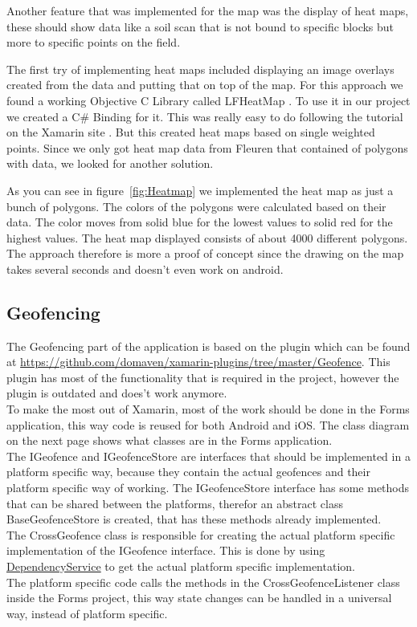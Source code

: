 Another feature that was implemented for the map was the display of heat maps, these should show data like a soil scan that is not bound to specific blocks but more to specific points on the field.

The first try of implementing heat maps included displaying an image \glspl{overlay} created from the data and putting that on top of the map. For this approach we found a working Objective C Library called LFHeatMap \cite{LFHeatMaps}. To use it in our project we created a C\# Binding for it.
This was really easy to do following the tutorial on the Xamarin site \cite{bindingtut}. But this created heat maps based on single weighted points. Since we only got heat map data from Fleuren that contained of polygons with data, we looked for another solution.

As you can see in figure~\ref{fig:Heatmap} we implemented the heat map as just a bunch of polygons. The colors of the polygons were calculated based on their data. The color moves from solid blue for the lowest values to solid red for the highest values. The heat map displayed consists of about 4000 different polygons. The approach therefore is more a proof of concept since the drawing on the map takes several seconds and doesn't even work on android.


\subsection{Geofencing}

The \gls{Geofencing} part of the application is based on the plugin which can be found at \url{https://github.com/domaven/xamarin-plugins/tree/master/Geofence}. This plugin has most of the functionality that is required in the project, however the plugin is outdated and does't work anymore. \\
To make the most out of Xamarin, most of the work should be done in the Forms application, this way code is reused for both Android and iOS. The class diagram on the next page shows what classes are in the Forms application. \\ 
The IGeofence and IGeofenceStore are interfaces that should be implemented in a platform specific way, because they contain the actual geofences and their platform specific way of working. The IGeofenceStore interface has some methods that can be shared between the platforms, therefor an abstract class BaseGeofenceStore is created, that has these methods already implemented.\\
The CrossGeofence class is responsible for creating the actual platform specific implementation of the IGeofence interface. This is done by using \href{https://developer.xamarin.com/guides/xamarin-forms/dependency-service/}{DependencyService} to get the actual platform specific implementation. \\
The platform specific code calls the methods in the CrossGeofenceListener class inside the Forms project, this way state changes can be handled in a universal way, instead of platform specific.

